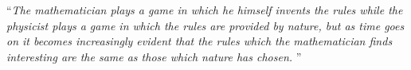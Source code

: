 \documentclass[
11pt,,a4paper %
]{book} %
\theoremstyle{TheoremStyle}
\theoremstyle{ExampleAndRemarkStyle}
\theoremstyle{ProofStyle}
\begin{document}
%
%
% 
% 

\cleardoublepage


\vspace*{0.2\textheight}

\noindent\enquote{\itshape The mathematician plays a game in which he himself invents the rules while the physicist plays a game in which the rules are provided by nature, but as time goes on it becomes increasingly evident that the rules which the mathematician finds interesting are the same as those which nature has chosen. }\bigbreak
\end{document}
